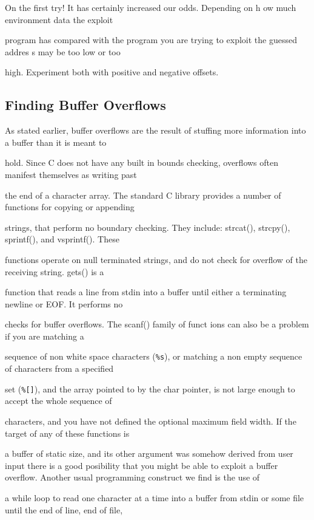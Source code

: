 \documentclass[12pt]{article}
\begin{document}
On the first try! It has certainly increased our odds. Depending on h ow much environment data the exploit 

program has compared with the program you are trying to exploit the guessed addres s may be too low or too 

high. Experiment both with positive and negative offsets. 

\subsection{Finding Buffer Overflows}

As stated earlier, buffer overflows are the result of stuffing more information into a buffer than it is meant to 

hold. Since C does not have any built in bounds checking, overflows often manifest themselves as writing past 

the end of a character array. The standard C library provides a number of functions for copying or appending  

strings, that perform no boundary checking. They include: strcat(), strcpy(), sprintf(), and vsprintf(). These 

functions operate on null terminated strings, and do not check for overflow of the receiving string. gets() is a 

function that reads a line from stdin into a buffer until either a terminating newline or EOF. It performs no 

checks for buffer overflows. The scanf() family of funct ions can also be a problem if you are matching a 

sequence of non white space characters (\verb+%s+),  or matching a non empty sequence of characters from a specified 

set (\verb+%[]+), and the array pointed to by the char pointer, is not large enough to accept the whole sequence of 

characters,  and you have not defined the optional maximum field width. If the target of any of these functions is 

a buffer of static size, and its other argument was somehow derived from user input there is a good posibility that you might be able to exploit a buffer overflow. Another usual programming construct we find is the use of 

a while loop to read one character at a time into a buffer from stdin or some file until the end of line, end of file, 
\end{document}
